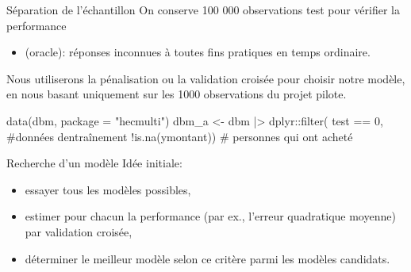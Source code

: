 \documentclass[
  ignorenonframetext,
]{beamer}
\newenvironment{Shaded}{\begin{snugshade}}{\end{snugshade}}
\newcommand{\AttributeTok}[1]{\textcolor[rgb]{0.40,0.45,0.13}{#1}}
\newcommand{\CommentTok}[1]{\textcolor[rgb]{0.37,0.37,0.37}{#1}}
\newcommand{\DecValTok}[1]{\textcolor[rgb]{0.68,0.00,0.00}{#1}}
\newcommand{\FunctionTok}[1]{\textcolor[rgb]{0.28,0.35,0.67}{#1}}
\newcommand{\NormalTok}[1]{\textcolor[rgb]{0.00,0.23,0.31}{#1}}
\newcommand{\OtherTok}[1]{\textcolor[rgb]{0.00,0.23,0.31}{#1}}
\newcommand{\SpecialCharTok}[1]{\textcolor[rgb]{0.37,0.37,0.37}{#1}}
\newcommand{\StringTok}[1]{\textcolor[rgb]{0.13,0.47,0.30}{#1}}
\providecommand{\tightlist}{%
  \setlength{\itemsep}{0pt}\setlength{\parskip}{0pt}}
\begin{document}
\begin{frame}[fragile]{Séparation de l'échantillon}
\protect{}\label{suxe9paration-de-luxe9chantillon}
On conserve 100 000 observations test pour vérifier la performance

\begin{itemize}
\tightlist
\item
  (oracle): réponses inconnues à toutes fins pratiques en temps
  ordinaire.
\end{itemize}

Nous utiliserons la pénalisation ou la validation croisée pour choisir
notre modèle, en nous basant uniquement sur les 1000 observations du
projet pilote.

\footnotesize

\begin{Shaded}
\begin{Highlighting}[numbers=left,,]
\FunctionTok{data}\NormalTok{(dbm, }\AttributeTok{package =} \StringTok{"hecmulti"}\NormalTok{)}
\NormalTok{dbm\_a }\OtherTok{\textless{}{-}}\NormalTok{ dbm }\SpecialCharTok{|\textgreater{}}
\NormalTok{  dplyr}\SpecialCharTok{::}\FunctionTok{filter}\NormalTok{(}
\NormalTok{    test }\SpecialCharTok{==} \DecValTok{0}\NormalTok{, }\CommentTok{\#données d\textquotesingle{}entraînement}
    \SpecialCharTok{!}\FunctionTok{is.na}\NormalTok{(ymontant)) }\CommentTok{\# personnes qui ont acheté}
\end{Highlighting}
\end{Shaded}

\normalsize
\end{frame}

\begin{frame}{Recherche d'un modèle}
\protect{}\label{recherche-dun-moduxe8le}
Idée initiale:

\begin{itemize}
\tightlist
\item
  essayer tous les modèles possibles,
\item
  estimer pour chacun la performance (par ex., l'erreur quadratique
  moyenne) par validation croisée,
\item
  déterminer le meilleur modèle selon ce critère parmi les modèles
  candidats.
\end{itemize}
\end{frame}
\end{document}
